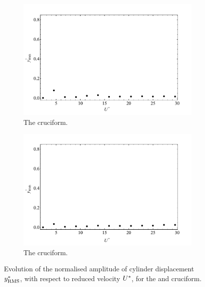 \documentclass[oneside]{utmthesis}
\begin{document}
\begin{figure}
  \centering
  \begin{subfigure}[h]{1\textwidth}
    \includegraphics[width=\textwidth]{figs/yStrRMS2}
  \caption{The \angfo{} cruciform.}
    \label{fig:yStrRMS2}
  \end{subfigure}
  
  \begin{subfigure}[h]{1\textwidth}
    \includegraphics[width=\textwidth]{figs/yStrRMS3}
    \caption{The \angth{} cruciform.}
    \label{fig:yStrRMS3}
  \end{subfigure}

  \caption{Evolution of the normalised \rms{} amplitude of cylinder displacement $y^{*}_{\text{RMS}}$, with respect to reduced velocity $U^{*}$, for the \angfo{} and \angth{} cruciform.}
  \label{fig:yStrRMS23}
\end{figure}
\end{document}
